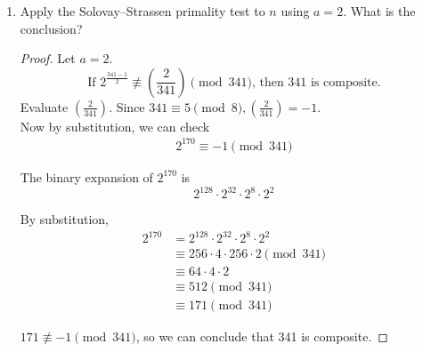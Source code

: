 \documentclass[11pt]{article}
\theoremstyle{definition}
\newcommand{\legendre}[2]{\ensuremath{\left( \frac{#1}{#2} \right) }}
\begin{document}
\begin{enumerate}
\begin{enumerate}
\begin{proof}
            By substitution,
            \begin{align*}
                2^{340} &\equiv 64\cdot 16\cdot 64\cdot 16 \pmod{341}\\
                        &\equiv 4\cdot 256 \pmod{341}\\
                        &\equiv 1 \pmod{341}
            \end{align*}

            We have found that $2^{340}\equiv 1\pmod{341}$, so the test is indeterminate.

        \end{proof}

        \item Apply the Solovay--Strassen primality test to $n$ using $a=2$. What is the conclusion?
        \begin{proof}
            Let $a=2$.
            \[
                \text{If } 2^{\frac{341-1}{2}}\not\equiv \legendre{2}{341}\pmod{341} \text{, then 341 is composite.}
            \]
            Evaluate $\legendre{2}{341}$.
            Since  $341\equiv 5\pmod{8}, \legendre{2}{341} = -1$. \\

            Now by substitution, we can check 
            \begin{align*}
                2^{170} \equiv -1 \pmod{341}  
            \end{align*}

            The binary expansion of $2^{170}$ is
            \[
                2^{128}\cdot 2^{32}\cdot 2^8\cdot 2^2
            \]

            By substitution, 
            \begin{align*}
                2^{170} &= 2^{128}\cdot 2^{32}\cdot 2^8\cdot 2^2 \\
                        &\equiv 256\cdot 4\cdot 256\cdot 2\pmod{341} \\
                        &\equiv 64\cdot 4\cdot 2 \\
                        &\equiv 512 \pmod{341} \\
                        &\equiv 171 \pmod{341}
            \end{align*}
            
            $171 \not\equiv -1 \pmod{341}$, so we can conclude that 341 is composite. 

        \end{proof}

    \end{enumerate}

    
\end{enumerate}
\end{document}
